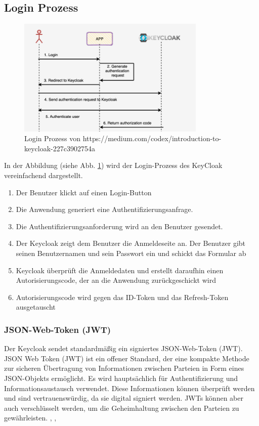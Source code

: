 \subsection{Login Prozess}
\begin{figure}[H]
  \includegraphics[width=0.8\textwidth]{pics/Keycloak_Auth.png}
  \centering
  \caption{Login Prozess von https://medium.com/codex/introduction-to-keycloak-227c3902754a}
  \label{fig:keycloak1}
\end{figure}

In der Abbildung (siehe Abb. \ref{fig:keycloak1}) wird der Login-Prozess des KeyCloak vereinfachend dargestellt.
\begin{enumerate}
  \item Der Benutzer klickt auf einen Login-Button
  \item Die Anwendung generiert eine Authentifizierungsanfrage.
  \item Die Authentifizierungsanforderung wird an den Benutzer gesendet.
  \item Der Keycloak zeigt dem Benutzer die Anmeldeseite an. Der Benutzer gibt seinen Benutzernamen und sein Passwort ein und schickt das Formular ab
  \item Keycloak überprüft die Anmeldedaten und erstellt daraufhin einen Autorisierungscode, der an die Anwendung zurückgeschickt wird
  \item Autorisierungscode wird gegen das ID-Token und das Refresh-Token ausgetauscht
\end{enumerate}

\subsubsection{JSON-Web-Token (JWT)}
Der Keycloak sendet standardmäßig ein signiertes JSON-Web-Token (JWT).
JSON Web Token (JWT) ist ein offener Standard, der eine kompakte Methode zur sicheren 
Übertragung von Informationen zwischen Parteien in Form eines JSON-Objekts ermöglicht. 
Es wird hauptsächlich für Authentifizierung und Informationsaustausch verwendet.
Diese Informationen können überprüft werden und sind vertrauenswürdig, da sie digital signiert werden.
JWTs können aber auch verschlüsselt werden, um die Geheimhaltung zwischen den Parteien zu gewährleisten. \cite{auth0com_jwtio_nodate}, \cite{noauthor_json_nodate}, \cite{noauthor_json_nodate-1}
 
